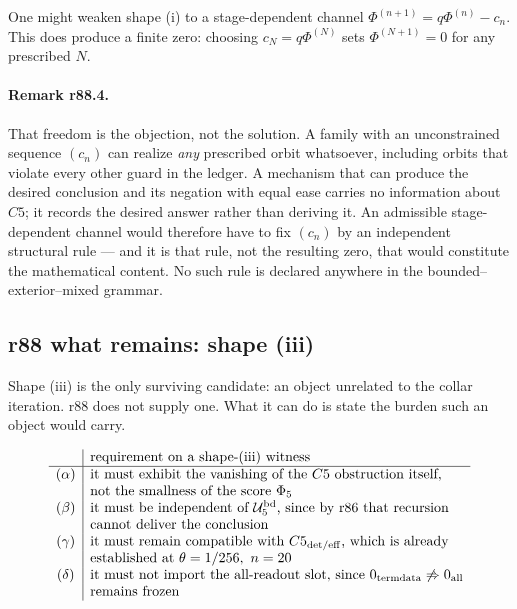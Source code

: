 One might weaken shape (i) to a stage-dependent channel
\(\Phi^{(n+1)}=q\Phi^{(n)}-c_n\).  This does produce a finite zero: choosing
\(c_N=q\Phi^{(N)}\) sets \(\Phi^{(N+1)}=0\) for any prescribed \(N\).

\paragraph{Remark r88.4.}
That freedom is the objection, not the solution.  A family with an unconstrained sequence
\((c_n)\) can realize \emph{any} prescribed orbit whatsoever, including orbits that violate
every other guard in the ledger.  A mechanism that can produce the desired conclusion and its
negation with equal ease carries no information about \(C5\); it records the desired answer
rather than deriving it.  An admissible stage-dependent channel would therefore have to fix
\((c_n)\) by an independent structural rule --- and it is that rule, not the resulting zero,
that would constitute the mathematical content.  No such rule is declared anywhere in the
bounded--exterior--mixed grammar.

\subsection*{r88 what remains: shape (iii)}
\label{subsec:r88-shape-three}

Shape (iii) is the only surviving candidate: an object unrelated to the collar iteration.
r88 does not supply one.  What it can do is state the burden such an object would carry.

\[
\begin{array}{c|l}
& \text{requirement on a shape-(iii) witness}\\
\hline
(\alpha) & \text{it must exhibit the vanishing of the }C5\text{ obstruction itself,}\\
 & \text{not the smallness of the score }\Phi_5\\
(\beta) & \text{it must be independent of }\mathcal U_5^{\rm bd}\text{, since by r86 that
 recursion}\\
 & \text{cannot deliver the conclusion}\\
(\gamma) & \text{it must remain compatible with }C5_{\rm det/eff}\text{, which is already}\\
 & \text{established at }\theta=1/256,\ n=20\\
(\delta) & \text{it must not import the all-readout slot, since }0_{\rm termdata}
 \not\Rightarrow0_{\rm all}\\
 & \text{remains frozen}
\end{array}
\]

